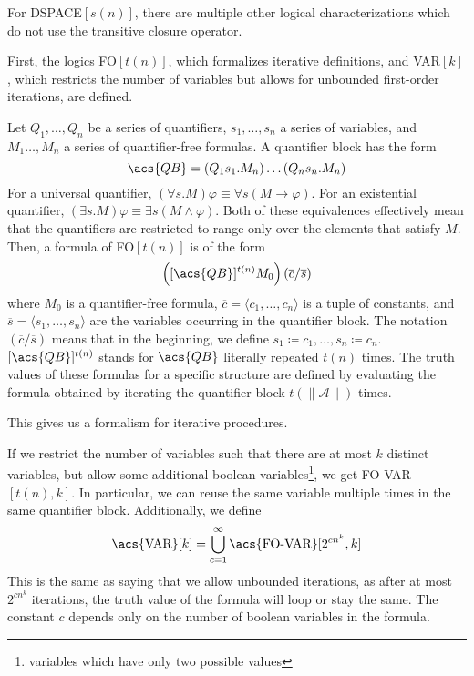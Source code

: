 For \acs{DSPACE}$[s(n)]$, there are multiple other logical characterizations which do not use the transitive closure operator.

First, the logics \acs{FO}$[t(n)]$, which formalizes iterative definitions, and \acs{VAR}$[k]$, which restricts the number of variables but allows for unbounded first-order iterations, are defined.

\begin{define}[{\acs{FO}$[t(n)]$}]
    Let $Q_1, \dots, Q_n$ be a series of quantifiers, $s_1, \dots, s_n$ a series of variables, and $M_1 \dots, M_n$ a series of quantifier-free formulas.
    A quantifier block has the form \[\acs{QB} = (Q_{1}s_{1}.M_{n})\dots(Q_{n}s_{n}.M_{n})\]
    For a universal quantifier, $(\forall s.M)\varphi \equiv \forall s (M \to \varphi)$.
    For an existential quantifier, $(\exists s.M)\varphi \equiv \exists s(M \land \varphi)$.
    Both of these equivalences effectively mean that the quantifiers are restricted to range only over the elements that satisfy $M$.
    Then, a formula of \acs{FO}$[t(n)]$ is of the form
    \[
        \left([\acs{QB}]^{t(n)}M_{0}\right)(\overline{c} / \overline{s})
    \]
    where $M_0$ is a quantifier-free formula, $\overline{c} = \langle c_1, \dots, c_n \rangle$ is a tuple of constants, and $\overline{s} = \langle s_1, \dots, s_n \rangle$ are the variables occurring in the quantifier block.
    The notation $(\overline{c} / \overline{s})$ means that in the beginning, we define $s_1 \coloneqq c_1, \dots, s_n \coloneqq c_n$.
    $[\acs{QB}]^{t(n)}$ stands for $\acs{QB}$ literally repeated $t(n)$ times.
    The truth values of these formulas for a specific structure are defined by evaluating the formula obtained by iterating the quantifier block $t(\lVert \mathcal{A}\rVert)$ times.
\end{define}
This gives us a formalism for iterative procedures.

If we restrict the number of variables such that there are at most $k$ distinct variables, but allow some additional boolean variables\footnote{variables which have only two possible values}, we get \acs{FO-VAR}$[t(n), k]$.
In particular, we can reuse the same variable multiple times in the same quantifier block.
Additionally, we define
\[
    \text{\acs{VAR}}[k] = \bigcup_{c = 1}^{\infty}\text{\acs{FO-VAR}}[2^{cn^k}, k]
\]
This is the same as saying that we allow unbounded iterations, as after at most $2^{cn^k}$ iterations, the truth value of the formula will loop or stay the same.
The constant $c$ depends only on the number of boolean variables in the formula.

